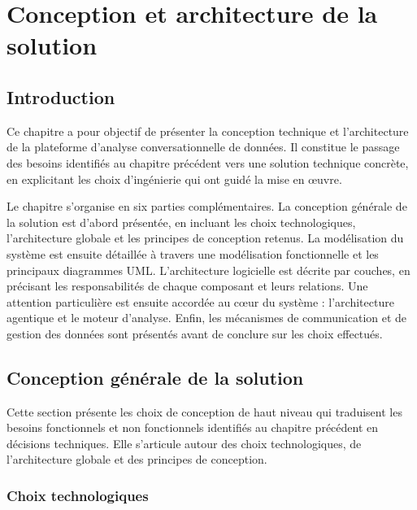 \chapter{Conception et architecture de la solution}

\section{Introduction}

Ce chapitre a pour objectif de présenter la conception technique et l'architecture de la plateforme d'analyse conversationnelle de données. Il constitue le passage des besoins identifiés au chapitre précédent vers une solution technique concrète, en explicitant les choix d'ingénierie qui ont guidé la mise en œuvre.

Le chapitre s'organise en six parties complémentaires. La conception générale de la solution est d'abord présentée, en incluant les choix technologiques, l'architecture globale et les principes de conception retenus. La modélisation du système est ensuite détaillée à travers une modélisation fonctionnelle et les principaux diagrammes UML. L'architecture logicielle est décrite par couches, en précisant les responsabilités de chaque composant et leurs relations. Une attention particulière est ensuite accordée au cœur du système : l'architecture agentique et le moteur d'analyse. Enfin, les mécanismes de communication et de gestion des données sont présentés avant de conclure sur les choix effectués.




\section{Conception générale de la solution}

Cette section présente les choix de conception de haut niveau qui traduisent les besoins fonctionnels et non fonctionnels identifiés au chapitre précédent en décisions techniques. Elle s'articule autour des choix technologiques, de l'architecture globale et des principes de conception.

\subsection{Choix technologiques}

